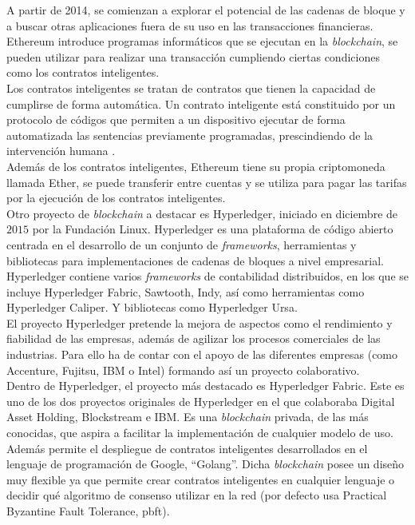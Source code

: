 A partir de 2014, se comienzan a explorar el potencial de las cadenas de bloque y a buscar otras aplicaciones fuera de su uso en las transacciones financieras.\\

Ethereum introduce programas informáticos que se ejecutan en la \textit{blockchain}, se pueden utilizar para realizar una transacción cumpliendo ciertas condiciones como los contratos inteligentes.\\

Los contratos inteligentes se tratan de contratos que tienen la capacidad de cumplirse de forma automática. Un contrato inteligente está constituido por un protocolo de códigos que permiten a un dispositivo ejecutar de forma automatizada las sentencias previamente programadas, prescindiendo de la intervención humana \cite{contrato-inteligente}.\\

\newpage
Además de los contratos inteligentes, Ethereum tiene su propia criptomoneda llamada Ether, se puede transferir entre cuentas y se utiliza para pagar las tarifas por la ejecución de los contratos inteligentes.\\

Otro proyecto de \textit{blockchain} a destacar es Hyperledger\cite{hyperledger-org}, iniciado en diciembre de $2015$ por la Fundación Linux. Hyperledger es una plataforma de código abierto centrada en el desarrollo de un conjunto de \textit{frameworks}, herramientas y bibliotecas para implementaciones de cadenas de bloques a nivel empresarial.\\

Hyperledger contiene varios \textit{frameworks} de contabilidad distribuidos, en los que se incluye Hyperledger Fabric, Sawtooth, Indy, así como herramientas como Hyperledger Caliper. Y bibliotecas como Hyperledger Ursa.\\

El proyecto Hyperledger pretende la mejora de aspectos como el rendimiento y fiabilidad de las empresas, además de agilizar los procesos comerciales de las industrias. Para ello ha de contar con el apoyo de las diferentes empresas (como Accenture, Fujitsu, IBM o Intel) formando así un proyecto colaborativo\cite{hyperledger-colab}.\\

Dentro de Hyperledger, el proyecto más destacado es Hyperledger Fabric. Este es uno de los dos proyectos originales de Hyperledger en el que colaboraba Digital Asset Holding, Blockstream e IBM. Es una \textit{blockchain} privada, de las más conocidas, que aspira a facilitar la implementación de cualquier modelo de uso. Además permite el despliegue de contratos inteligentes desarrollados en el lenguaje de programación de Google, ``Golang''. Dicha \textit{blockchain} posee un diseño muy flexible ya que permite crear contratos inteligentes en cualquier lenguaje o decidir qué algoritmo de consenso utilizar en la red (por defecto usa Practical Byzantine Fault Tolerance, \acrshort{pbft})\cite{hyperledger-fabric}.\\

